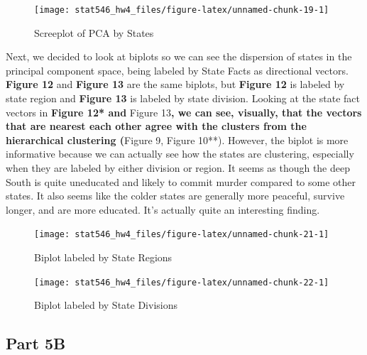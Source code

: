 \documentclass[]{article}
\begin{document}
\begin{figure}

{\centering \texttt{[image: stat546\_hw4\_files/figure-latex/unnamed-chunk-19-1]} 

}

\caption{Screeplot of PCA by States}\label{fig:unnamed-chunk-19}
\end{figure}

Next, we decided to look at biplots so we can see the dispersion of
states in the principal component space, being labeled by State Facts as
directional vectors. \textbf{Figure 12} and \textbf{Figure 13} are the
same biplots, but \textbf{Figure 12} is labeled by state region and
\textbf{Figure 13} is labeled by state division. Looking at the state
fact vectors in \textbf{Figure 12* and }Figure 13\textbf{, we can see,
visually, that the vectors that are nearest each other agree with the
clusters from the hierarchical clustering (}Figure 9, Figure 10**).
However, the biplot is more informative because we can actually see how
the states are clustering, especially when they are labeled by either
division or region. It seems as though the deep South is quite
uneducated and likely to commit murder compared to some other states. It
also seems like the colder states are generally more peaceful, survive
longer, and are more educated. It's actually quite an interesting
finding.

\begin{figure}[h]

{\centering \texttt{[image: stat546\_hw4\_files/figure-latex/unnamed-chunk-21-1]} 

}

\caption{Biplot labeled by State Regions}\label{fig:unnamed-chunk-21}
\end{figure}

\begin{figure}[h]

{\centering \texttt{[image: stat546\_hw4\_files/figure-latex/unnamed-chunk-22-1]} 

}

\caption{Biplot labeled by State Divisions}\label{fig:unnamed-chunk-22}
\end{figure}

\subsection{Part 5B}\label{part-5b}
\end{document}
